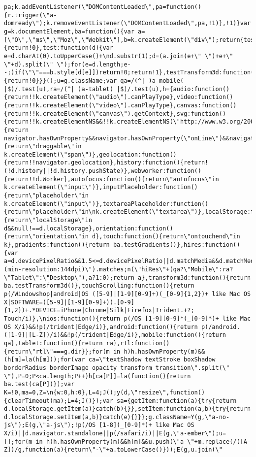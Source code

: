 \documentclass[
]{article}
\begin{document}
\begin{verbatim}
pa;k.addEventListener(\"DOMContentLoaded\",pa=function(){r.trigger(\"a-domready\");k.removeEventListener(\"DOMContentLoaded\",pa,!1)},!1)}var g=k.documentElement,ba=function(){var a=[\"O\",\"ms\",\"Moz\",\"Webkit\"],b=k.createElement(\"div\");return{testGradients:function(){return!0},test:function(d){var e=d.charAt(0).toUpperCase()+\nd.substr(1);d=(a.join(e+\" \")+e+\" \"+d).split(\" \");for(e=d.length;e--;)if(\"\"===b.style[d[e]])return!0;return!1},testTransform3d:function(){return!0}}}();u=g.className;var qa=/(^| )a-mobile( |$)/.test(u),ra=/(^| )a-tablet( |$)/.test(u),h={audio:function(){return!!k.createElement(\"audio\").canPlayType},video:function(){return!!k.createElement(\"video\").canPlayType},canvas:function(){return!!k.createElement(\"canvas\").getContext},svg:function(){return!!k.createElementNS&&!!k.createElementNS(\"http://www.w3.org/2000/svg\",\n\"svg\").createSVGRect},offline:function(){return navigator.hasOwnProperty&&navigator.hasOwnProperty(\"onLine\")&&navigator.onLine},dragDrop:function(){return\"draggable\"in k.createElement(\"span\")},geolocation:function(){return!!navigator.geolocation},history:function(){return!(!d.history||!d.history.pushState)},webworker:function(){return!!d.Worker},autofocus:function(){return\"autofocus\"in k.createElement(\"input\")},inputPlaceholder:function(){return\"placeholder\"in k.createElement(\"input\")},textareaPlaceholder:function(){return\"placeholder\"in\nk.createElement(\"textarea\")},localStorage:function(){return\"localStorage\"in d&&null!==d.localStorage},orientation:function(){return\"orientation\"in d},touch:function(){return\"ontouchend\"in k},gradients:function(){return ba.testGradients()},hires:function(){var a=d.devicePixelRatio&&1.5<=d.devicePixelRatio||d.matchMedia&&d.matchMedia(\"(min-resolution:144dpi)\").matches;n(\"hiRes\"+(qa?\"Mobile\":ra?\"Tablet\":\"Desktop\"),a?1:0);return a},transform3d:function(){return ba.testTransform3d()},touchScrolling:function(){return p(/Windowshop|android|OS ([5-9]|[1-9][0-9]+)(_[0-9]{1,2})+ like Mac OS X|SOFTWARE=([5-9]|[1-9][0-9]+)(.[0-9]{1,2})+.*DEVICE=iPhone|Chrome|Silk|Firefox|Trident.+?; Touch/i)},\nios:function(){return p(/OS [1-9][0-9]*(_[0-9]*)+ like Mac OS X/i)&&!p(/trident|Edge/i)},android:function(){return p(/android.([1-9]|[L-Z])/i)&&!p(/trident|Edge/i)},mobile:function(){return qa},tablet:function(){return ra},rtl:function(){return\"rtl\"===g.dir}};for(m in h)h.hasOwnProperty(m)&&(h[m]=la(h[m]));for(var ca=\"textShadow textStroke boxShadow borderRadius borderImage opacity transform transition\".split(\" \"),P=0;P<ca.length;P++)h[ca[P]]=la(function(){return ba.test(ca[P])});var K=!0,ma=0,Z=\n{w:0,h:0},L=4;J();y(d,\"resize\",function(){clearTimeout(ma);L=4;J()});var sa={getItem:function(a){try{return d.localStorage.getItem(a)}catch(b){}},setItem:function(a,b){try{return d.localStorage.setItem(a,b)}catch(e){}}};g.className=Y(g,\"a-no-js\");E(g,\"a-js\");!p(/OS [1-8](_[0-9]*)+ like Mac OS X/i)||d.navigator.standalone||p(/safari/i)||E(g,\"a-ember\");u=[];for(m in h)h.hasOwnProperty(m)&&h[m]&&u.push(\"a-\"+m.replace(/([A-Z])/g,function(a){return\"-\"+a.toLowerCase()}));E(g,u.join(\" 
\end{verbatim}
\end{document}
